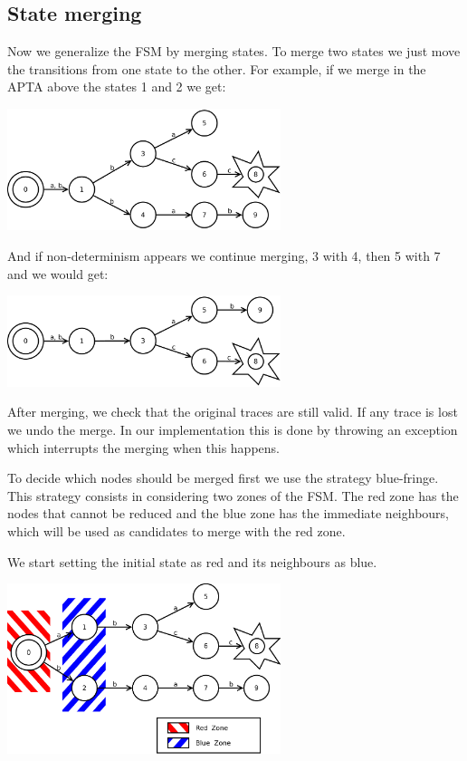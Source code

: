 \documentclass[]{sigplanconf}
\begin{document}
\subsection{State merging}

Now we generalize the FSM by merging states. To merge two
states we just move the transitions from one state to the other.
For example, if we merge in the APTA above the states 1 and 2
we get:

\begin{center}
\includegraphics[width=8cm]{pictures/fsm2.pdf}
\end{center}

And if non-determinism appears we continue merging, 3 with 4, then
5 with 7 and we would get:

\begin{center}
\includegraphics[width=8cm]{pictures/fsm3.pdf}
\end{center}

After merging, we check that the original traces are still
valid. If any trace is lost we undo the merge. In our implementation
this is done by throwing an exception which interrupts the merging
when this happens.

To decide which nodes should be merged first we use the strategy
blue-fringe. This strategy consists in considering two zones of the
FSM. The red zone has the nodes that cannot be reduced
and the blue zone has the immediate neighbours, which will
be used as candidates to merge with the red zone.

We start setting the initial state as red and its neighbours as blue.

\begin{center}
\includegraphics[width=8cm]{pictures/fsm4.pdf}
\end{center}
\end{document}
